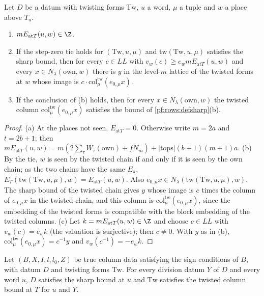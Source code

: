 \begin{lemma}\label{pf:rows:twcol}
Let $D$ be a datum with twisting forms $\mathrm{Tw}$, $u$ a word, $\mu$ a tuple and $w$ a place above $T_u$.
\begin{enumerate}[label=(\alph*)]
\item $mE_{\mathrm{at}T}(u,w)\in\Z$.
\item If the step-zero tie holds for $(\mathrm{Tw},u,\mu)$ and $\mathrm{tw}(\mathrm{Tw},u,\mu)$ satisfies the sharp bound, then for
every $c\in\mathit{LL}$ with $v_w(c)\ge e_wmE_{\mathrm{at}T}(u,w)$ and every $x\in N_\lambda(\mathrm{own},w)$ there is $y$ in the
level-$m$ lattice of the twisted forms at $w$ whose image is $c\cdot\mathrm{col}^{\mathrm{tw}}_\mu(e_{0,\mu}x)$.
\item If the conclusion of (b) holds, then for every $x\in N_\lambda(\mathrm{own},w)$ the twisted column
$\mathrm{col}^{\mathrm{tw}}_\mu(e_{0,\mu}x)$ satisfies the bound of \cref{pf:rows:defsharp}(b).
\end{enumerate}
\end{lemma}

\begin{proof}
(a) At the places not seen, $E_{\mathrm{at}T}=0$. Otherwise write $m=2a$ and $t=2b+1$; then
$mE_{\mathrm{at}T}(u,w)=m(2\sum_\tau W_\tau(\mathrm{own})+fN_m)+|\mathrm{tops}|(b+1)(m+1)a$.
(b) By the tie, $w$ is seen by the twisted chain if and only if it is seen by the own chain; as the two chains have the same
$E_\pi$, $E_T(\mathrm{tw}(\mathrm{Tw},u,\mu),w)=E_{\mathrm{at}T}(u,w)$. Also $e_{0,\mu}x\in N_\lambda(\mathrm{tw}(\mathrm{Tw},u,\mu),w)$. The
sharp bound of the twisted chain gives $y$ whose image is $c$ times the column of $e_{0,\mu}x$ in the twisted chain, and this
column is $\mathrm{col}^{\mathrm{tw}}_\mu(e_{0,\mu}x)$, since the embedding of the twisted forms is compatible with the block
embedding of the twisted columns.
(c) Let $k=mE_{\mathrm{at}T}(u,w)\in\Z$ and choose $c\in\mathit{LL}$ with $v_w(c)=e_wk$ (the valuation is surjective); then $c\ne0$.
With $y$ as in (b), $\mathrm{col}^{\mathrm{tw}}_\mu(e_{0,\mu}x)=c^{-1}y$ and $v_w(c^{-1})=-e_wk$.
\end{proof}

\begin{theorem}\label{pf:rows:closingsharp}
Let $(B,X,I,l,l_0,Z)$ be true column data satisfying the sign conditions of $B$, with datum $D$ and twisting forms
$\mathrm{Tw}$. For every division datum $Y$ of $D$ and every word $u$, $D$ satisfies the sharp bound at $u$ and $\mathrm{Tw}$
satisfies the twisted column bound at $T$ for $u$ and $Y$.
\end{theorem}

